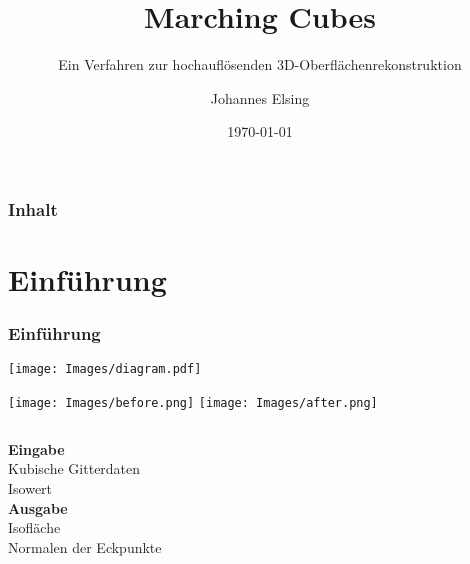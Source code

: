 \documentclass{beamer}
\title{\textbf{Marching Cubes}}
\subtitle{\small Ein Verfahren zur hochauflösenden 3D-Oberflächenrekonstruktion}
\author{Johannes Elsing}
\institute{Universität Freiburg}
\date{\today}
\begin{document}

\maketitle

\begin{frame}
  \frametitle{Inhalt}
  \tableofcontents
\end{frame}

\section{Einführung}
\begin{frame}[t]
  \frametitle{Einführung}
\begin{minipage}{\textwidth}
\texttt{[image: Images/diagram.pdf]}
\end{minipage}
\begin{center}
\texttt{[image: Images/before.png]}
\hspace{2.8cm}
\texttt{[image: Images/after.png]}
\end{center}

\vfill
\begin{columns}[t]
  \textbf{\hspace{0.5cm} Eingabe}\\
  \hspace{0.5cm} Kubische Gitterdaten\\
  \hspace{0.5cm} Isowert\\

  \textbf{\hspace{1.1cm} Ausgabe}\\
  \hspace{1.2cm}Isofläche\\
  \hspace{1.2cm}Normalen der Eckpunkte\\
\end{columns}

\end{frame}
\end{document}
